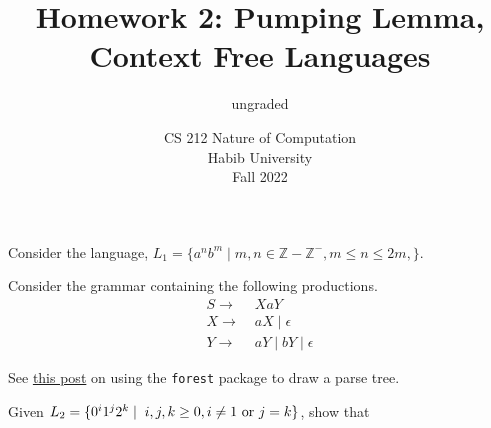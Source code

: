 \documentclass[addpoints]{exam}
\title{Homework 2: Pumping Lemma, Context Free Languages}
\author{ungraded} %
\date{CS 212 Nature of Computation\\Habib University\\Fall 2022}
\begin{document}
\maketitle

\begin{questions}

\question \label{q:lang} Consider the language, $L_1 = \{a^nb^m \mid m,n\in\mathbb{Z}-\mathbb{Z}^-, m\leq n\leq 2m, \}$.

\question Consider the grammar containing the following productions.
\begin{align*} 
  S \to &\; XaY\\
  X \to &\; aX \mid \epsilon\\
  Y \to &\; aY \mid bY \mid \epsilon
\end{align*}

  See \href{https://tex.stackexchange.com/a/214657/44301}{this post} on using the \texttt{forest} package to draw a parse tree.

\question Given $L_2 = \{0^i1^j2^k \mid \hspace{1mm} i,j,k \geq 0, i \neq 1 \text{ or } j = k\}$, show that 
  \begin{parts}

\end{parts}
\end{questions}
\end{document}
